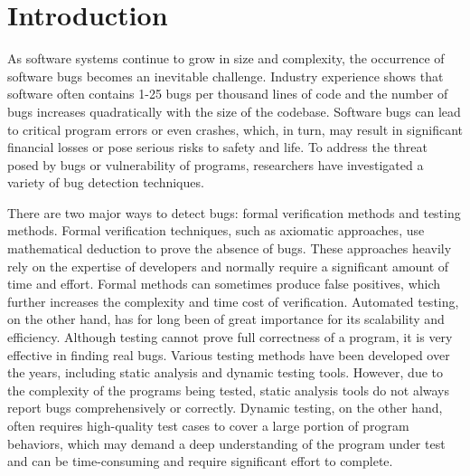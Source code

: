 \chapter{\label{cha:intro}Introduction}

\listoftodos{}

As software systems continue to grow in size and complexity, the occurrence of software bugs becomes an inevitable challenge. Industry experience shows that software often contains 1-25 bugs per thousand lines of code\cite{code-complete} and the number of bugs increases quadratically with the size of the codebase\cite{month}. Software bugs can lead to critical program errors or even crashes, which, in turn, may result in significant financial losses\cite{bug4} or pose serious risks to safety and life\cite{bug1, bug2, bug3}. To address the threat posed by bugs or vulnerability of programs, researchers have investigated a variety of bug detection techniques. 

There are two major ways to detect bugs: formal verification methods and testing methods. Formal verification techniques, such as axiomatic approaches, use mathematical deduction to prove the absence of bugs. These approaches heavily rely on the expertise of developers and normally require a significant amount of time and effort\cite{sel4}. Formal methods can sometimes produce false positives, which further increases the complexity and time cost of verification.
Automated testing, on the other hand, has for long been of great importance for its scalability and efficiency. Although testing cannot prove full correctness of a program, it is very effective in finding real bugs. Various testing methods have been developed over the years, including static analysis\cite{infer, RacerD} and dynamic testing tools\cite{ASAN, TSAN}. However, due to the complexity of the programs being tested, static analysis tools do not always report bugs comprehensively or correctly. Dynamic testing, on the other hand, often requires high-quality test cases to cover a large portion of program behaviors, which may demand a deep understanding of the program under test and can be time-consuming and require significant effort to complete.


